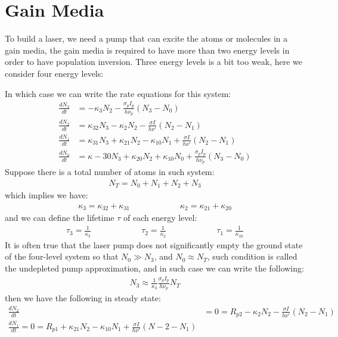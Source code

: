 \documentclass[11pt]{book}
\theoremstyle{break}
\theoremstyle{break}
\begin{document}
\section[Gain Media]{\color{red}Gain Media\color{black}}
To build a laser, we need a pump that can excite the atoms or molecules in a gain media, the gain media is required to have more than two energy levels in order to have population inversion. Three energy levels is a bit too weak, here we consider four energy levels:
\begin{center}

\end{center}
In which case we can write the rate equations for this system:
\begin{align*}
\frac{dN_3}{dt} &= -\kappa_3 N_2 - \frac{\sigma_p I_p}{h\nu_p}(N_3 - N_0)\\
\frac{dN_2}{dt} &= \kappa_{32}N_3 - \kappa_2 N_2 - \frac{\sigma I}{h\nu'}(N_2 - N_1) \\
\frac{dN_1}{dt}&= \kappa_{31}N_3 + \kappa_{21}N_2 - \kappa_{10}N_1+\frac{\sigma I}{h\nu'}(N_2 - N_1)\\
\frac{dN_0}{dt} &= \kappa-{30}N_3 + \kappa_{20}N_2 + \kappa_{10}N_0 + \frac{\sigma_p I_p}{h\nu_p}(N_3 - N_0)
\end{align*}
Suppose there is a total number of atoms in such system:
\begin{align*}
N_T = N_{0} + N_1 + N_2 + N_3
\end{align*}
which implies we have:
\begin{align*}
\kappa_3 = \kappa_{32} + \kappa_{31} \qquad\qquad\qquad \kappa_2 = \kappa_{21} + \kappa_{20}
\end{align*}
and we can define the lifetime $\tau$ of each energy level:
\begin{align*}
\tau_3 = \frac{1}{\kappa_3} \qquad \qquad \qquad \tau_2 = \frac{1}{\kappa_2} \qquad\qquad\qquad \tau_1 = \frac{1}{\kappa_{10}}
\end{align*}
It is often true that the laser pump
does not significantly empty the ground state of the four-level system so that $N_0 \gg N_3$, and $N_0 \approx N_T$, such condition is called the undepleted pump approximation, and in such case we can write the following:
\begin{align*}
N_3 \approx \frac{1}{\kappa_3}\frac{\sigma_p I_p}{h\nu_p}N_T
\end{align*}
then we have the following in steady state:
\begin{align*}
\frac{dN_2}{dt} &= 0 = R_{p2} - \kappa_2 N_2 - \frac{\sigma I}{h\nu'}(N_2 - N_1) \\
\frac{dN_1}{dt} = 0 = R_{p1} + \kappa_{21}N_2 - \kappa_{10}N_1 + \frac{\sigma I}{h\nu'}(N-2 - N_1)
\end{align*}
\end{document}
